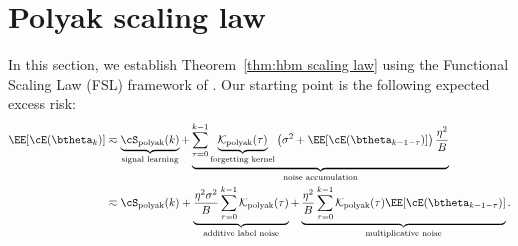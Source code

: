 \documentclass[11pt]{article}
\newcommand{\sgd}{\mathrm{sgd}}
\newcommand{\polyak}{\mathrm{polyak}}
\begin{document}





\section{Polyak scaling law}
\label{app:hbm scaling law}



In this section, we establish Theorem~\ref{thm:hbm scaling law} using the Functional Scaling Law (FSL) framework of \citet{li2026functional}. Our starting point is the following expected excess risk:
\begin{align}
    \EE[\cE(\btheta_k)] 
    &\eqsim \underbrace{\cS_{\polyak}(k)}_{\text{signal learning}} +\underbrace{\sum_{\tau=0}^{k-1}\underbrace{\mathcal{K}_{\polyak}(\tau)}_{\text{forgetting kernel}} \left(\sigma^2 + \EE[\cE(\btheta_{k-1-\tau})]\right) \frac{\eta^2}{B}}_{\text{noise accumulation}} \label{eq:pol_fsl_intro_org}\\
    &\eqsim \cS_{\polyak}(k) + \underbrace{\frac{\eta^2\sigma^2}{B}\sum_{\tau=0}^{k-1}\mathcal{K}_{\polyak}(\tau)}_{\text{additive label noise}} + \underbrace{\frac{\eta^2}{B}\sum_{\tau=0}^{k-1}\mathcal{K}_{\polyak}(\tau)\EE[\cE(\btheta_{k-1-\tau})]}_{\text{multiplicative noise}}. \label{eq:pol_fsl_intro}
\end{align}
\end{document}
